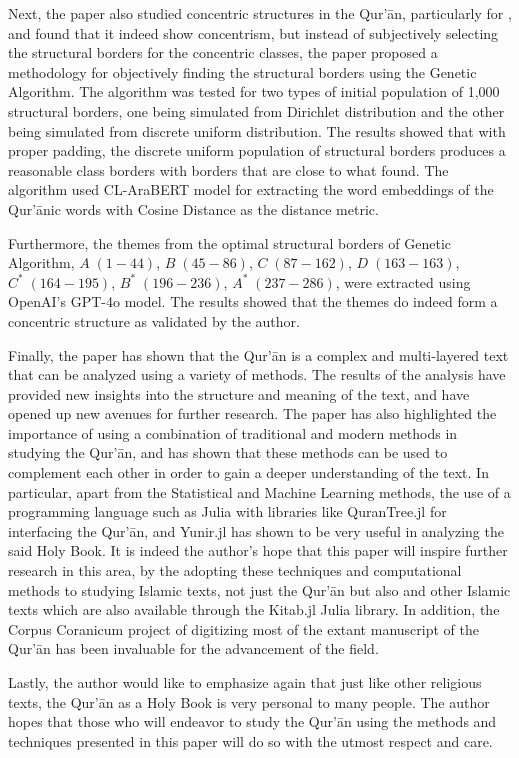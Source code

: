 Next, the paper also studied concentric structures in the Qur'\=an, particularly for  , and found that it indeed show concentrism, but instead of subjectively selecting the structural borders for the concentric classes, the paper proposed a methodology for objectively finding the structural borders using the Genetic Algorithm. The algorithm was tested for two types of initial population of 1,000 structural borders, one being simulated from Dirichlet distribution and the other being simulated from discrete uniform distribution. The results showed that with proper padding, the discrete uniform population of structural borders produces a reasonable class borders with borders that are close to what  found. The algorithm used CL-AraBERT model for extracting the word embeddings of the Qur'\=anic words with Cosine Distance as the distance metric.

Furthermore, the themes from the optimal structural borders of Genetic Algorithm, $A\;(1-44)$, $B\;(45-86)$, $C\;(87-162)$, $D\;(163-163)$, $C^*\;(164-195)$, $B^*\;(196-236)$, $A^*\;(237-286)$, were extracted using OpenAI's GPT-4o model. The results showed that the themes do indeed form a concentric structure as validated by the author.

Finally, the paper has shown that the Qur'\=an is a complex and multi-layered text that can be analyzed using a variety of methods. The results of the analysis have provided new insights into the structure and meaning of the text, and have opened up new avenues for further research. The paper has also highlighted the importance of using a combination of traditional and modern methods in studying the Qur'\=an, and has shown that these methods can be used to complement each other in order to gain a deeper understanding of the text. In particular, apart from the Statistical and Machine Learning methods, the use of a programming language such as Julia with libraries like QuranTree.jl \cite{asaad2021qurantree} for interfacing the Qur'\=an, and Yunir.jl \cite{al_ahmadgaid_b_asaad_yunir} has shown to be very useful in analyzing the said Holy Book. It is indeed the author's hope that this paper will inspire further research in this area, by the adopting these techniques and computational methods to studying Islamic texts, not just the Qur'\=an but also   and other Islamic texts which are also available through the Kitab.jl \cite{al_ahmadgaid_b_asaad_kitab} Julia library. In addition, the Corpus Coranicum project of digitizing most of the extant manuscript of the Qur'\=an has been invaluable for the advancement of the field.

Lastly, the author would like to emphasize again that just like other religious texts, the Qur'\=an as a Holy Book is very personal to many people. The author hopes that those who will endeavor to study the Qur'\=an using the methods and techniques presented in this paper will do so with the utmost respect and care. 